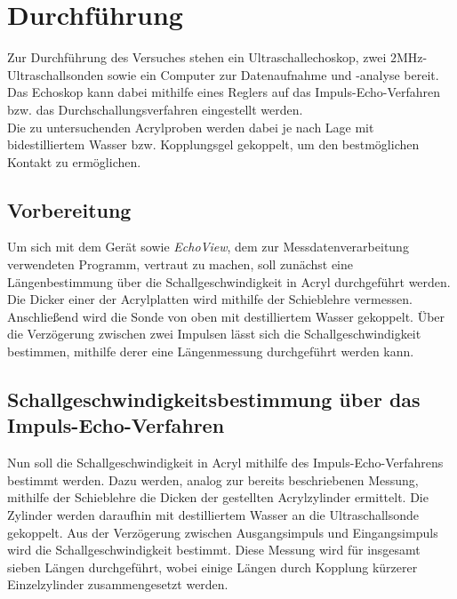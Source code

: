 \section{Durchführung}
\label{sec:Durchführung}

Zur Durchführung des Versuches stehen ein Ultraschallechoskop, zwei $2 \unit{\mega\hertz}$-Ultraschallsonden sowie ein Computer zur Datenaufnahme und -analyse bereit.
Das Echoskop kann dabei mithilfe eines Reglers auf das Impuls-Echo-Verfahren bzw. das Durchschallungsverfahren eingestellt werden. \\

Die zu untersuchenden Acrylproben werden dabei je nach Lage mit bidestilliertem Wasser bzw. Kopplungsgel gekoppelt, um den bestmöglichen Kontakt zu ermöglichen. \\


\subsection{Vorbereitung}

Um sich mit dem Gerät sowie \textit{EchoView}, dem zur Messdatenverarbeitung verwendeten Programm, vertraut zu machen, soll zunächst eine Längenbestimmung über die Schallgeschwindigkeit in Acryl durchgeführt werden.
Die Dicker einer der Acrylplatten wird mithilfe der Schieblehre vermessen. Anschließend wird die Sonde von oben mit destilliertem Wasser gekoppelt. %
Über die Verzögerung zwischen zwei Impulsen lässt sich die Schallgeschwindigkeit bestimmen, mithilfe derer eine Längenmessung durchgeführt werden kann. \\


\subsection{Schallgeschwindigkeitsbestimmung über das Impuls-Echo-Verfahren}

Nun soll die Schallgeschwindigkeit in Acryl mithilfe des Impuls-Echo-Verfahrens bestimmt werden.
Dazu werden, analog zur bereits beschriebenen Messung, mithilfe der Schieblehre die Dicken der gestellten Acrylzylinder ermittelt.
Die Zylinder werden daraufhin mit destilliertem Wasser an die Ultraschallsonde gekoppelt. Aus der Verzögerung zwischen Ausgangsimpuls und Eingangsimpuls wird die Schallgeschwindigkeit bestimmt.%
Diese Messung wird für insgesamt sieben Längen durchgeführt, wobei einige Längen durch Kopplung kürzerer Einzelzylinder zusammengesetzt werden. \\


